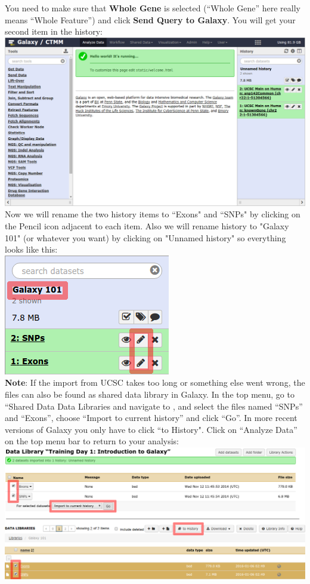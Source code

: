 \documentclass[11pt,a4paper]{article}
\begin{document}
You need to make sure that \textbf{Whole Gene} is selected (``Whole Gene'' here really means ``Whole Feature'') and click \textbf{Send Query to Galaxy}. You will get your second item in the history:\\
\includegraphics[width=\textwidth]{figures/101_08}\\
Now we will rename the two history items to ``Exons" and ``SNPs" by clicking on the Pencil icon adjacent to each item. Also we will rename history to "Galaxy 101" (or whatever you want) by clicking on "Unnamed history" so everything looks like this:\\
\includegraphics[scale=0.65]{figures/101_09}\\
\textbf{Note}: If the import from UCSC takes too long or something else went wrong, the files can also be found as shared data library in Galaxy. In the top menu, go to ``Shared Data \rightarrow Data Libraries and navigate to \textit{\datalibrarydirintroduction}, and select the files named ``SNPs'' and ``Exons'', choose ``Import to current history'' and click ``Go''. In more recent versions of Galaxy you only have to click ``to History". Click on ``Analyze Data'' on the top menu bar to return to your analysis:\\
\includegraphics[width=\textwidth]{figures/101_10}\\
\end{document}
